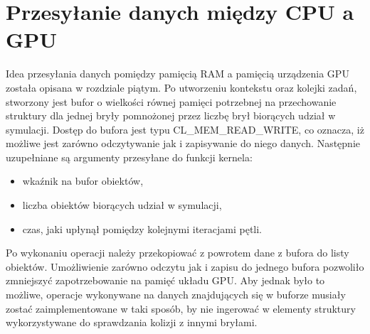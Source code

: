\section{Przesyłanie danych między CPU a GPU}
Idea przesyłania danych pomiędzy pamięcią RAM a pamięcią urządzenia GPU została opisana w rozdziale piątym. Po utworzeniu kontekstu oraz kolejki zadań, stworzony jest bufor o wielkości równej pamięci potrzebnej na przechowanie struktury dla jednej bryły pomnożonej przez liczbę brył biorących udział w symulacji. Dostęp do bufora jest typu CL\_MEM\_READ\_WRITE, co oznacza, iż możliwe jest zarówno odczytywanie jak i zapisywanie do niego danych. Następnie uzupełniane są argumenty przesyłane do funkcji kernela:
\begin{itemize}
\item wkaźnik na bufor obiektów,
\item liczba obiektów biorących udział w symulacji,
\item czas, jaki upłynął pomiędzy kolejnymi iteracjami pętli.
\end{itemize}
Po wykonaniu operacji należy przekopiować z powrotem dane z bufora do listy obiektów. Umożliwienie zarówno odczytu jak i zapisu do jednego bufora pozwoliło zmniejszyć zapotrzebowanie na pamięć układu GPU. Aby jednak było to możliwe, operacje wykonywane na danych znajdujących się w buforze musiały zostać zaimplementowane w taki sposób, by nie ingerować w elementy struktury wykorzystywane do sprawdzania kolizji z innymi bryłami.